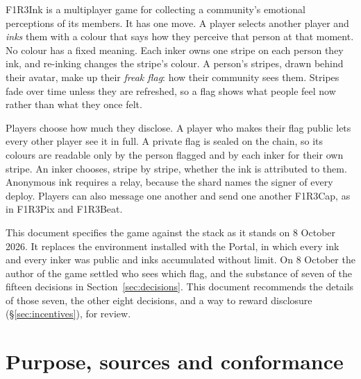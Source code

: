 \documentclass[11pt,a4paper]{article}
\newcommand{\caps}[1]{{\addfontfeatures{LetterSpace=12}\MakeUppercase{#1}}}
\newcounter{req}
\begin{document}
\begin{center}
\begin{minipage}{0.9\linewidth}
{\spartanbold\fontsize{8.5}{10}\selectfont\caps{Summary}}\par\smallskip
F1R3Ink is a multiplayer game for collecting a community's emotional perceptions of its
members. It has one move. A player selects another player and \emph{inks} them with a colour
that says how they perceive that person at that moment. No colour has a fixed meaning. Each
inker owns one stripe on each person they ink, and re-inking changes the stripe's colour. A
person's stripes, drawn behind their avatar, make up their \emph{freak flag}: how their
community sees them. Stripes fade over time unless they are refreshed, so a flag shows what
people feel now rather than what they once felt.

Players choose how much they disclose. A player who makes their flag public lets every other
player see it in full. A private flag is sealed on the chain, so its colours are readable only
by the person flagged and by each inker for their own stripe. An inker chooses, stripe by stripe,
whether the ink is attributed to them. Anonymous ink requires a relay, because the shard names
the signer of every deploy. Players can also message one another and send one another F1R3Cap,
as in F1R3Pix and F1R3Beat.

This document specifies the game against the stack as it stands on 8 October 2026. It replaces
the environment installed with the Portal, in which every ink and every inker was public and
inks accumulated without limit. On 8 October the author of the game settled who sees which
flag, and the substance of seven of the fifteen decisions in Section~\ref{sec:decisions}. This
document recommends the details of those seven, the other eight decisions, and a way to reward
disclosure (\S\ref{sec:incentives}), for review.
\end{minipage}
\end{center}

\vspace{2mm}
\begingroup\small\setlength{\parskip}{0pt}\tableofcontents\endgroup
\newpage

\section{Purpose, sources and conformance}
\end{document}
